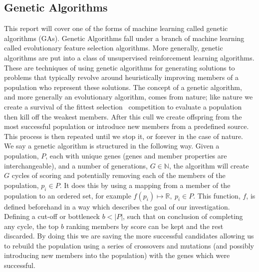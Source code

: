 \subsection{Genetic Algorithms}\label{subsec:geneticAlgorithms}
This report will cover one of the forms of machine learning called genetic algorithms (GAs).
Genetic Algorithms fall under a branch of machine learning called evolutionary feature selection algorithms.
More generally, genetic algorithms are put into a class of unsupervised reinforcement learning algorithms.
These are techniques of using genetic algorithms for generating solutions to problems that typically revolve around heuristically improving members of a population who represent these solutions.
The concept of a genetic algorithm, and more generally an evolutionary algorithm, comes from nature;
like nature we create a survival of the fittest selection~\cite{darwin2009origin} competition to evaluate a population then kill off the weakest members.
After this cull we create offspring from the most successful population or introduce new members from a predefined source.
This process is then repeated until we stop it, or forever in the case of nature.\\

We say a genetic algorithm is structured in the following way.
Given a population, \(P\), each with unique genes (genes and member properties are interchangeable), and a number of generations, \(G\in \mathbb{N}\), the algorithm will create \(G\) cycles of scoring and potentially removing each of the members of the population, \(p_i \in P\).
It does this by using a mapping from a member of the population to an ordered set, for example \(f(p_i)\mapsto \mathbb{R},\ p_i \in P\).
This function, \(f\), is defined beforehand in a way which describes the goal of our investigation.
Defining a cut-off or bottleneck \(b<|P|\), such that on conclusion of completing any cycle, the top \(b\) ranking members by score can be kept and the rest discarded.
By doing this we are saving the more successful candidates allowing us to rebuild the population using a series of crossovers and mutations (and possibly introducing new members into the population) with the genes which were successful.

